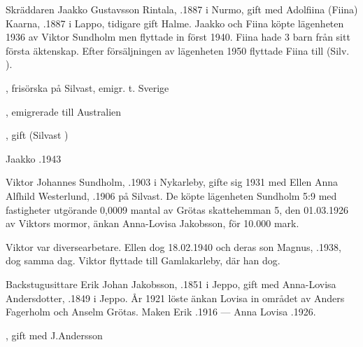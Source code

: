 Skräddaren Jaakko Gustavsson Rintala, .1887 i Nurmo, gift med Adolfiina (Fiina) Kaarna, .1887 i Lappo, tidigare gift Halme. Jaakko och Fiina  köpte lägenheten 1936 av Viktor Sundholm men flyttade in först 1940. Fiina hade 3 barn från sitt första äktenskap. Efter försäljningen av lägenheten 1950 flyttade Fiina till (Silv.     ).
\begin{jhchildren}
  \item {}, frisörska på Silvast, emigr. t. Sverige
  \item {}, emigrerade till Australien
  \item {}, gift (Silvast      )
\end{jhchildren}
Jaakko .1943

Viktor Johannes Sundholm, .1903 i Nykarleby, gifte sig 1931 med Ellen Anna Alfhild Westerlund, .1906 på Silvast. De köpte lägenheten Sundholm 5:9 med fastigheter utgörande 0,0009 mantal av Grötas skattehemman 5, den 01.03.1926 av Viktors mormor, änkan Anna-Lovisa Jakobsson, för 10.000 mark.

Viktor var diversearbetare. Ellen dog 18.02.1940 och deras son Magnus, .1938, dog samma dag. Viktor flyttade till Gamlakarleby, där han dog.


Backstugusittare Erik Johan Jakobsson, .1851 i Jeppo, gift med Anna-Lovisa Andersdotter, .1849 i Jeppo. År 1921 löste änkan Lovisa in området av Anders Fagerholm och Anselm Grötas.
Maken Erik .1916  ---  Anna Lovisa .1926.
\begin{jhchildren}
  \item {}
  \item {}, gift med J.Andersson
  \item {}
  \item {}
  \item {}
\end{jhchildren}


